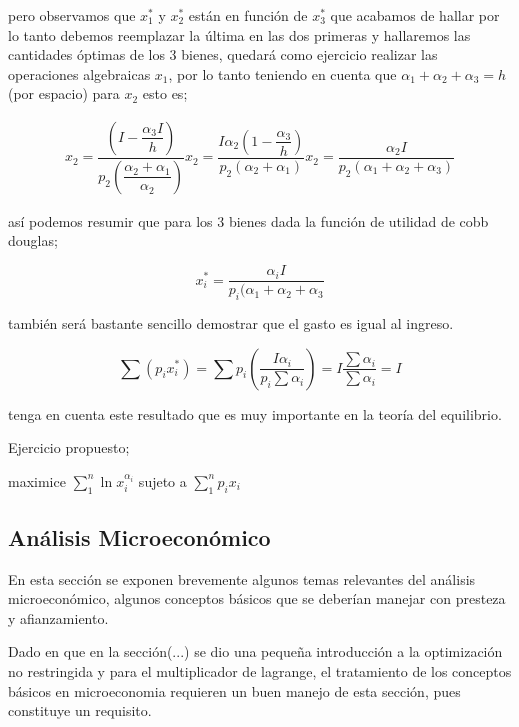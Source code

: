 \documentclass[12pt]{article}
\begin{document}
pero observamos que $x_{1}^{*}$ y $x_{2}^{*}$ están en función de $x_{3}^{*} $ que acabamos de hallar por lo tanto debemos reemplazar la última en las  dos primeras y hallaremos las cantidades óptimas de los 3 bienes, quedará como ejercicio realizar las operaciones algebraicas  $x_{1}$, por lo tanto teniendo en cuenta que $\alpha_{1}+\alpha_{2}+\alpha_{3}=h$ (por espacio) para $x_{2}$ esto es;


\begin{eqnarray}


x_{2}= \dfrac{  (I-\dfrac{\alpha_{3}I}{h})}{p_{2}(\dfrac{\alpha_{2} + \alpha_{1}}{\alpha_{2}})}

x_{2} = \dfrac{ I \alpha_{2}(1-\dfrac{\alpha_{3}}{h})}{p_{2}( \alpha_{2}+\alpha_{1})}

x_{2}=\dfrac{\alpha_{2}I}{p_{2}(\alpha_{1}+\alpha_{2}+\alpha_{3})}


\end{eqnarray}

así podemos resumir que para los 3 bienes dada la función de utilidad de cobb douglas; 

$$x_{i}^{*}=\dfrac{\alpha_{i}I}{p_{i}(\alpha_{1}+\alpha_{2}+\alpha_{3}}$$

también será bastante sencillo demostrar que el gasto es igual al ingreso.


$$ \sum(p_{i}x_{i}^{*})=\sum p_{i}(\dfrac{I \alpha_{i}}{p_{i}\sum\alpha_{i} }) = I \dfrac{\sum \alpha_{i}}{\sum \alpha_{i}}=I $$


tenga en cuenta este resultado que es muy importante en la teoría del equilibrio.

Ejercicio propuesto; 

maximice $ \sum_{1}^{n} \ln x_{i}^{\alpha_{i}}$ sujeto a $\sum_{1}^{n} p_{i}x_{i}$


\subsection*{Análisis Microeconómico}

En esta sección se exponen brevemente algunos temas relevantes del análisis microeconómico, algunos conceptos básicos que se deberían manejar con presteza  y afianzamiento.

Dado en que en la sección(...) se dio una pequeña introducción a la optimización no restringida y para el multiplicador de lagrange,  el tratamiento de los conceptos básicos en microeconomia requieren un buen manejo de esta sección, pues constituye un requisito.
\end{document}
